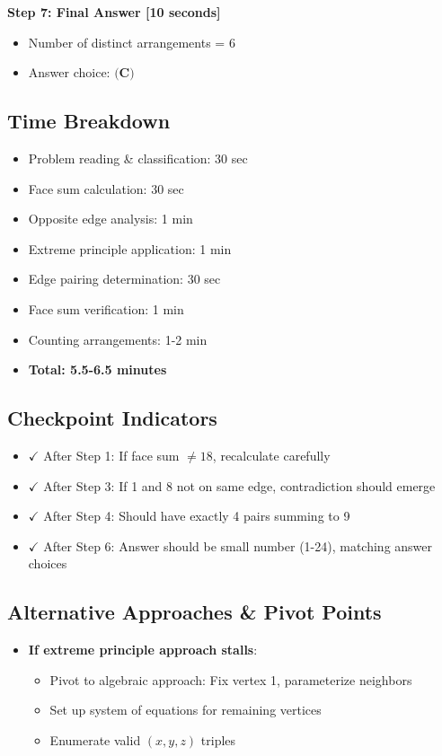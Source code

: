 \documentclass[]{article}
\begin{document}
\begin{solutionbox}
\textbf{Step 7: Final Answer [10 seconds]}
\begin{itemize}[nosep]
    \item Number of distinct arrangements = $\boxed{6}$
    \item Answer choice: $\boxed{\textbf{(C)}}$
\end{itemize}

\subsection*{Time Breakdown}
\begin{itemize}[nosep]
    \item Problem reading \& classification: 30 sec
    \item Face sum calculation: 30 sec
    \item Opposite edge analysis: 1 min
    \item Extreme principle application: 1 min
    \item Edge pairing determination: 30 sec
    \item Face sum verification: 1 min
    \item Counting arrangements: 1-2 min
    \item \textbf{Total: 5.5-6.5 minutes}
\end{itemize}

\subsection*{Checkpoint Indicators}
\begin{itemize}[nosep]
    \item $\checkmark$ After Step 1: If face sum $\neq 18$, recalculate carefully
    \item $\checkmark$ After Step 3: If 1 and 8 not on same edge, contradiction should emerge
    \item $\checkmark$ After Step 4: Should have exactly 4 pairs summing to 9
    \item $\checkmark$ After Step 6: Answer should be small number (1-24), matching answer choices
\end{itemize}

\subsection*{Alternative Approaches \& Pivot Points}
\begin{itemize}[leftmargin=*]
    \item \textbf{If extreme principle approach stalls}:
    \begin{itemize}
        \item Pivot to algebraic approach: Fix vertex 1, parameterize neighbors
        \item Set up system of equations for remaining vertices
        \item Enumerate valid $(x,y,z)$ triples
    \end{itemize}
    

\end{itemize}
\end{solutionbox}
\end{document}
